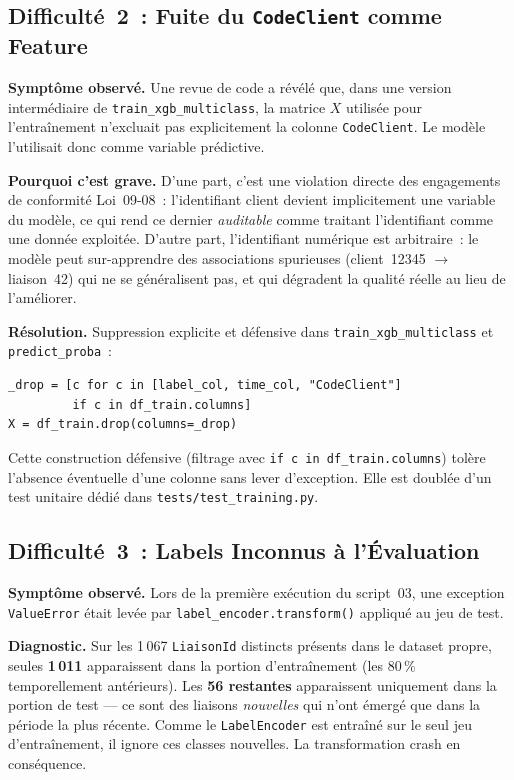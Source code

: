 \documentclass[11pt, a4paper]{article}
\begin{document}
\subsection{Difficulté~2~: Fuite du \texttt{CodeClient} comme Feature}

\textbf{Symptôme observé.} Une revue de code a révélé que, dans une
version intermédiaire de \texttt{train\_xgb\_multiclass}, la matrice
$X$ utilisée pour l'entraînement n'excluait pas explicitement la
colonne \texttt{CodeClient}. Le modèle l'utilisait donc comme variable
prédictive.

\textbf{Pourquoi c'est grave.} D'une part, c'est une violation directe
des engagements de conformité Loi~09-08~: l'identifiant client devient
implicitement une variable du modèle, ce qui rend ce dernier
\textit{auditable} comme traitant l'identifiant comme une donnée
exploitée. D'autre part, l'identifiant numérique est arbitraire~:
le modèle peut sur-apprendre des associations spurieuses
(client~12345 $\rightarrow$ liaison~42) qui ne se généralisent pas, et
qui dégradent la qualité réelle au lieu de l'améliorer.

\textbf{Résolution.} Suppression explicite et défensive dans
\texttt{train\_xgb\_multiclass} et \texttt{predict\_proba}~:

\begin{lstlisting}[style=py]
_drop = [c for c in [label_col, time_col, "CodeClient"]
         if c in df_train.columns]
X = df_train.drop(columns=_drop)
\end{lstlisting}

Cette construction défensive (filtrage avec \texttt{if c in
df\_train.columns}) tolère l'absence éventuelle d'une colonne sans
lever d'exception. Elle est doublée d'un test unitaire dédié dans
\texttt{tests/test\_training.py}.

\subsection{Difficulté~3~: Labels Inconnus à l'Évaluation}

\textbf{Symptôme observé.} Lors de la première exécution du
script~03, une exception \texttt{ValueError} était levée par
\texttt{label\_encoder.transform()} appliqué au jeu de test.

\textbf{Diagnostic.} Sur les 1\,067 \texttt{LiaisonId} distincts
présents dans le dataset propre, seules \textbf{1\,011} apparaissent
dans la portion d'entraînement (les 80\,\% temporellement
antérieurs). Les \textbf{56 restantes} apparaissent uniquement dans la
portion de test --- ce sont des liaisons \textit{nouvelles} qui n'ont
émergé que dans la période la plus récente. Comme le
\texttt{LabelEncoder} est entraîné sur le seul jeu d'entraînement, il
ignore ces classes nouvelles. La transformation crash en conséquence.
\end{document}
